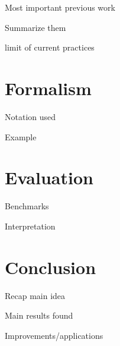 \documentclass[journal]{IEEEtran}
\begin{document}
Most important previous work

Summarize them

limit of current practices



\section{Formalism}
Notation used

Example



\section{Evaluation}
Benchmarks

Interpretation



\section{Conclusion}
Recap main idea

Main results found

Improvements/applications

\cite{gollins01}
\cite{peters12}
\cite{savoy09}
\cite{yu09}



\end{document}
